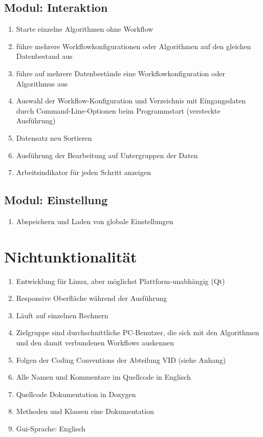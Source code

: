 	\subsection{Modul: Interaktion}
		\begin{enumerate}[ align=left, label={\textbf{\textbackslash FK4\arabic*0\textbackslash}} ]
			\item Starte einzelne Algorithmen ohne Workflow
			\item führe mehrere Workflowkonfigurationen oder Algorithmen  auf den gleichen Datenbestand aus
			\item führe auf mehrere Datenbestände eine Workflowkonfiguration oder Algorithmus aus
			\item Auswahl der Workflow-Konfiguration und Verzeichnis mit Eingangsdaten durch Command-Line-Optionen beim Programmstart (versteckte Ausführung)
			\item Datensatz neu Sortieren
			\item Ausführung der Bearbeitung auf Untergruppen der Daten
			\item Arbeitsindikator für jeden Schritt anzeigen
		\end{enumerate}

	\subsection{Modul: Einstellung}
		\begin{enumerate}[ align=left, label={\textbf{\textbackslash FK5\arabic*0\textbackslash}} ]
		\item Abspeichern und Laden von globale Einstellungen
		\end{enumerate}

\section{Nichtunktionalität}
		\begin{enumerate}[ align=left, label={\textbf{\textbackslash NF1\arabic*0\textbackslash}} ]
			\item Entwicklung für Linux, aber möglichst Plattform-unabhängig (Qt)
			\item Responsive Oberfläche während der Ausführung
			\item Läuft auf einzelnen Rechnern
			\item Zielgruppe sind durchschnittliche PC-Benutzer, die sich mit den Algorithmen und den damit verbundenen Workflows auskennen
			\item Folgen der Coding Conventions der Abteilung VID (siehe Anhang)
			\item Alle Namen und Kommentare im Quellcode in Englisch
			\item Quellcode Dokumentation in Doxygen
			\item Methoden und Klassen eine Dokumentation
			\item Gui-Sprache: Englisch
		\end{enumerate}

